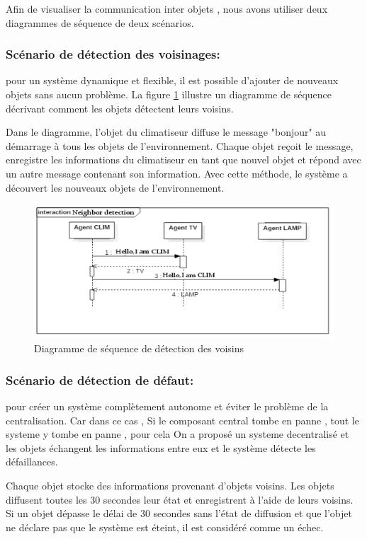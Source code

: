 Afin de visualiser la communication inter objets , nous avons utiliser deux diagrammes de séquence de deux scénarios.

\subsubsection{Scénario de détection des voisinages:} pour un système dynamique et flexible, il est possible d'ajouter de nouveaux objets sans aucun problème. La figure \ref{fc17} illustre un diagramme de séquence décrivant comment les objets détectent leurs voisins. 

Dans le diagramme, l'objet du climatiseur diffuse le message "bonjour" au démarrage à tous les objets de l'environnement. Chaque objet reçoit le message, enregistre les informations du climatiseur en tant que nouvel objet et répond avec un autre message contenant son information. Avec cette méthode, le système a découvert les nouveaux objets de l'environnement.




\begin{figure}[H]
\centering
\includegraphics[scale=1.2]{chap1/fc17.png}
\caption{Diagramme de séquence de détection des voisins}
\label{fc17}
\end{figure}
\subsubsection{Scénario de détection de défaut:} pour créer un système complètement autonome et éviter le problème de la centralisation. Car dans ce cas , Si le composant central tombe en panne , tout le systeme y tombe en panne , pour cela On a proposé un systeme decentralisé et les objets échangent les informations entre eux et le système détecte les défaillances.


Chaque objet stocke des informations provenant d'objets voisins. Les objets diffusent toutes les 30 secondes leur état et enregistrent à l'aide de leurs voisins. Si un objet dépasse le délai de 30 secondes sans l'état de diffusion et que l'objet ne déclare pas que le système est éteint, il est considéré comme un échec.


